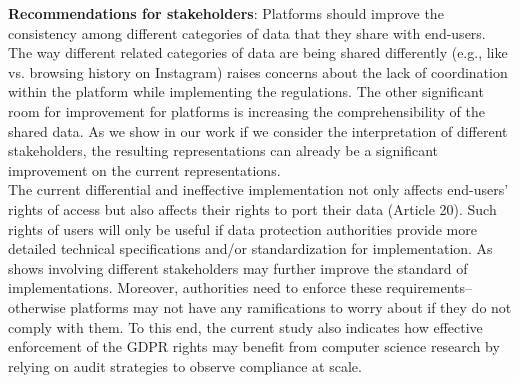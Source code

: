 \noindent
\textbf{Recommendations for stakeholders}:  
Platforms should improve the consistency among different categories of data that they share with end-users. 
The way different related categories of data are being shared differently (e.g., like vs. browsing history on Instagram) raises concerns about the lack of coordination within the platform while implementing the regulations. 
The other significant room for improvement for platforms is increasing the comprehensibility of the shared data. 
As we show in our work if we consider the interpretation of different stakeholders, the resulting representations can already be a significant improvement on the current representations. \\
The current differential and ineffective implementation not only affects end-users' rights of access but also affects their rights to port their data (Article 20). 
Such rights of users will only be useful if data protection authorities provide more detailed technical specifications and/or standardization for implementation. 
As  shows involving different stakeholders may further improve the standard of implementations. 
Moreover, authorities need to enforce these requirements--otherwise platforms may not have any ramifications to worry about if they do not comply with them.
To this end, the current study also indicates how effective enforcement of the GDPR rights may benefit from computer science research by relying on audit strategies %
to observe compliance at scale. 

